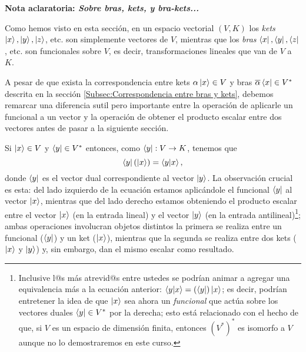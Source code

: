 \documentclass[12pt,dvipsnames]{article}
\begin{document}
\newpage
\begin{tcolorbox}
\begin{center}
    \textbf{Nota aclaratoria: \emph{Sobre bras, kets, y bra-kets...}}
\end{center}

\hspace{3mm} Como hemos visto en esta sección, en un espacio vectorial $(V,K)$ los \emph{kets} $\ket{x},\ket{y},\ket{z}$, etc. son simplemente vectores de $V$, mientras que los \emph{bras} $\bra{x},\bra{y},\bra{z}$, etc. son funcionales sobre $V$, es decir, transformaciones lineales que van de $V$ a $K$.

\vspace{5mm}
\hspace{3mm} A pesar de que exista la correspondencia entre kets $\alpha\ket{x}\in V$ y bras $\overline{\alpha}\bra{x}\in V^*$ descrita en la sección \ref{Subsec:Correspondencia entre bras y kets}, debemos remarcar una diferencia sutil pero importante entre la operación de aplicarle un funcional a un vector y la operación de obtener el producto escalar entre dos vectores antes de pasar a la siguiente sección.

\vspace{5mm}
\hspace{3mm} Si $\ket{x}\in V$ y $\bra{y}\in V^*$ entonces, como $\bra{y}:V\to K$, tenemos que $$\bra{y}(\ket{x}) = \braket{y|x},$$ donde $\bra{y}$ es el vector dual correspondiente al vector $\ket{y}$. La observación crucial es esta: del lado izquierdo de la ecuación estamos aplicándole el funcional $\bra{y}$ al vector $\ket{x}$, mientras que del lado derecho estamos obteniendo el producto escalar entre el vector $\ket{x}$ (en la entrada lineal) y el vector $\ket{y}$ (en la entrada antilineal)\footnote{Inclusive l@s más atrevid@s entre ustedes se podrían animar a agregar una equivalencia más a la ecuación anterior: $\braket{y|x}=(\bra{y})\ket{x}$; es decir, podrían entretener la idea de que $\ket{x}$ sea ahora un \emph{funcional} que actúa sobre los vectores duales $\bra{y}\in V^*$ por la derecha; esto está relacionado con el hecho de que, si $V$ es un espacio de dimensión finita, entonces $(V^*)^*$ es isomorfo a $V$ \textemdash aunque no lo demostraremos en este curso.}; ambas operaciones involucran objetos distintos \textemdash la primera se realiza entre un funcional ($\bra{y}$) y un ket ($\ket{x}$), mientras que la segunda se realiza entre dos kets ($\ket{x}$ y $\ket{y}$)\textemdash\hspace{1mm} y, sin embargo, dan el mismo escalar como resultado.

\vspace{5mm}

\end{tcolorbox}
\end{document}
